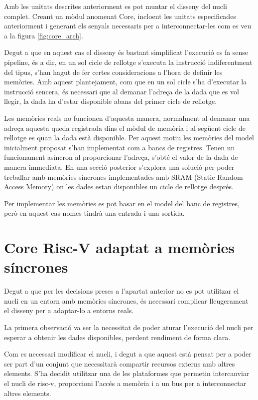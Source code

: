 \documentclass[10pt,a4paper,twocolumn,twoside]{article}
\begin{document}
    Amb les unitats descrites anteriorment es pot muntar el disseny del nucli complet. Creant un mòdul anomenat Core, incloent les unitats especificades anteriorment i generant els senyals necessaris per a interconnectar-les com es veu a la figura \ref{fig:core_arch}.
    
    Degut a que en aquest cas el disseny és bastant simplificat l'execució es fa sense pipeline, és a dir, en un sol cicle de rellotge s'executa la instrucció indiferentment del tipus, s'han hagut de fer certes consideracions a l'hora de definir les memòries. 
    Amb aquest plantejament, com que en un sol cicle s’ha d’executar la instrucció sencera, és necessari que al demanar l’adreça de la dada que es vol llegir, la dada ha d’estar disponible abans del primer cicle de rellotge. 
    
    Les memòries reals no funcionen d'aquesta manera, normalment al demanar una adreça aquesta queda registrada dins el mòdul de memòria i al següent cicle de rellotge es quan la dada està disponible. Per aquest motiu les memòries del model inicialment proposat s'han implementat com a bancs de registres. Tenen un funcionament asíncron al proporcionar l'adreça, s'obté el valor de la dada de manera immediata. En una secció posterior s'explora una solució per poder treballar amb memòries síncrones implementades amb SRAM (Static Random Access Memory) on les dades estan disponibles un cicle de rellotge després.
    
    Per implementar les memòries es pot basar en el model del banc de registres, però en aquest cas nomes tindrà una entrada i una sortida.

        
        
\section{Core Risc-V adaptat a memòries síncrones}
    Degut a que per les decisions preses a l'apartat anterior no es pot utilitzar el nucli en un entorn amb memòries síncrones, és necessari complicar lleugerament el disseny per a adaptar-lo a entorns reals. 
    
    La primera observació va ser la necessitat de poder aturar l'execució del nucli per esperar a obtenir les dades disponibles, perdent rendiment de forma clara.
    
    Com es necessari modificar el nucli, i degut a que aquest està pensat per a poder ser part d'un conjunt que necessitarà compartir recursos externs amb altres elements. S'ha decidit utilitzar una de les plataformes que permetin intercanviar el nucli de risc-v, proporcioni l'accés a memòria i a un bus per a interconnectar altres elements.
    
\end{document}
